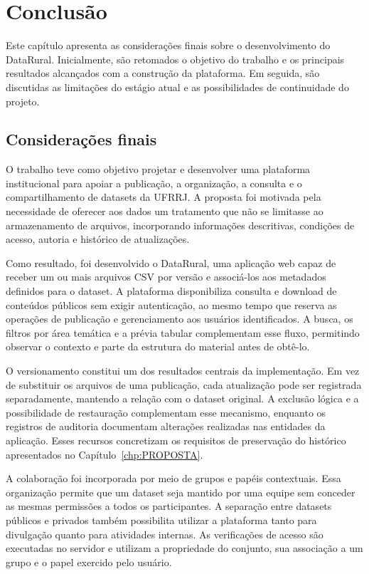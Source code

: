 \chapter{Conclusão}\label{chp:CONCLUSAO}

Este capítulo apresenta as considerações finais sobre o desenvolvimento do DataRural. Inicialmente, são retomados o objetivo do trabalho e os principais resultados alcançados com a construção da plataforma. Em seguida, são discutidas as limitações do estágio atual e as possibilidades de continuidade do projeto.

\section{Considerações finais}

O trabalho teve como objetivo projetar e desenvolver uma plataforma institucional para apoiar a publicação, a organização, a consulta e o compartilhamento de datasets da UFRRJ. A proposta foi motivada pela necessidade de oferecer aos dados um tratamento que não se limitasse ao armazenamento de arquivos, incorporando informações descritivas, condições de acesso, autoria e histórico de atualizações.

Como resultado, foi desenvolvido o DataRural, uma aplicação web capaz de receber um ou mais arquivos CSV por versão e associá-los aos metadados definidos para o dataset. A plataforma disponibiliza consulta e download de conteúdos públicos sem exigir autenticação, ao mesmo tempo que reserva as operações de publicação e gerenciamento aos usuários identificados. A busca, os filtros por área temática e a prévia tabular complementam esse fluxo, permitindo observar o contexto e parte da estrutura do material antes de obtê-lo.

O versionamento constitui um dos resultados centrais da implementação. Em vez de substituir os arquivos de uma publicação, cada atualização pode ser registrada separadamente, mantendo a relação com o dataset original. A exclusão lógica e a possibilidade de restauração complementam esse mecanismo, enquanto os registros de auditoria documentam alterações realizadas nas entidades da aplicação. Esses recursos concretizam os requisitos de preservação do histórico apresentados no Capítulo~\ref{chp:PROPOSTA}.

A colaboração foi incorporada por meio de grupos e papéis contextuais. Essa organização permite que um dataset seja mantido por uma equipe sem conceder as mesmas permissões a todos os participantes. A separação entre datasets públicos e privados também possibilita utilizar a plataforma tanto para divulgação quanto para atividades internas. As verificações de acesso são executadas no servidor e utilizam a propriedade do conjunto, sua associação a um grupo e o papel exercido pelo usuário.

